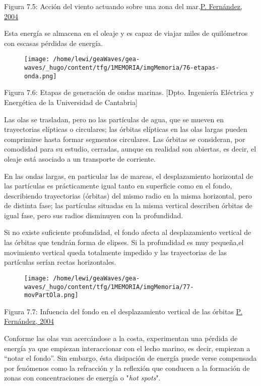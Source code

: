 Figura 7.5: Acción del viento actuando sobre una zona del
mar.\href{http://es.pfernandezdiez.es/index.php?pageID=15}{P. Fernández,
2004}

Esta energía se almacena en el oleaje y es capaz de viajar miles de
quilómetros con escasas pérdidas de energía.

\begin{figure}
\centering
\texttt{[image: /home/lewi/geaWaves/gea-waves/\_hugo/content/tfg/1MEMORIA/imgMemoria/76-etapas-onda.png]}
\caption{}
\end{figure}

Figura 7.6: Etapas de generación de ondas marinas. {[}Dpto. Ingeniería
Eléctrica y Energética de la Universidad de Cantabria{]}

Las olas se trasladan, pero no las partículas de agua, que se mueven en
trayectorias elípticas o circulares; las órbitas elípticas en las olas
largas pueden comprimirse hasta formar segmentos circulares. Las órbitas
se consideran, por comodidad para su estudio, cerradas, aunque en
realidad son abiertas, es decir, el oleaje está asociado a un transporte
de corriente.

En las ondas largas, en particular las de mareas, el desplazamiento
horizontal de las partículas es prácticamente igual tanto en superficie
como en el fondo, describiendo trayectorias (órbitas) del mismo radio en
la misma horizontal, pero de distinta fase; las partículas situadas en
la misma vertical describen órbitas de igual fase, pero sus radios
disminuyen con la profundidad.

Si no existe suficiente profundidad, el fondo afecta al desplazamiento
vertical de las órbitas que tendrán forma de elipses. Si la profundidad
es muy pequeña,el movimiento vertical queda totalmente impedido y las
trayectorias de las partículas serían rectas horizontales.

\begin{figure}
\centering
\texttt{[image: /home/lewi/geaWaves/gea-waves/\_hugo/content/tfg/1MEMORIA/imgMemoria/77-movPartOla.png]}
\caption{}
\end{figure}

Figura 7.7: Infuencia del fondo en el desplazamiento vertical de las
órbitas
\href{http://files.pfernandezdiez.es/EnergiasAlternativas/mar/PDFs/01Olas.pdf}{P.
Fernández, 2004}

Conforme las olas van acercándose a la costa, experimentan una pérdida
de energía ya que empiezan interaccionar con el lecho marino, es decir,
empiezan a ``notar el fondo''. Sin embargo, ésta disipación de energía
puede verse compensada por fenómenos como la refracción y la reflexión
que conducen a la formación de zonas con concentraciones de energía o
"\emph{hot spots}".

